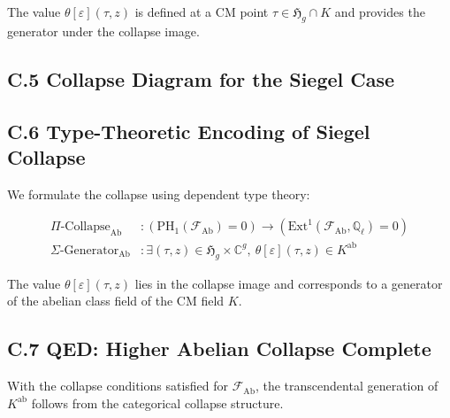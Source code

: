 \documentclass[11pt]{article}
\begin{document}
The value \( \theta[\varepsilon](\tau, z) \) is defined at a CM point \( \tau \in \mathfrak{H}_g \cap K \) and provides the generator under the collapse image.

\subsection*{C.5 Collapse Diagram for the Siegel Case}

\begin{center}
\end{center}

\subsection*{C.6 Type-Theoretic Encoding of Siegel Collapse}

We formulate the collapse using dependent type theory:

\begin{align*}
\Pi\text{-Collapse}_{\mathrm{Ab}} &\colon \left( \mathrm{PH}_1(\mathcal{F}_{\mathrm{Ab}}) = 0 \right) \rightarrow \left( \mathrm{Ext}^1(\mathcal{F}_{\mathrm{Ab}}, \mathbb{Q}_\ell) = 0 \right) \\
\Sigma\text{-Generator}_{\mathrm{Ab}} &\colon \exists (\tau, z) \in \mathfrak{H}_g \times \mathbb{C}^g,\ \theta[\varepsilon](\tau, z) \in K^{\mathrm{ab}}
\end{align*}

The value \( \theta[\varepsilon](\tau, z) \) lies in the collapse image and corresponds to a generator of the abelian class field of the CM field \( K \).

\subsection*{C.7 QED: Higher Abelian Collapse Complete}

With the collapse conditions satisfied for \( \mathcal{F}_{\mathrm{Ab}} \), the transcendental generation of \( K^{\mathrm{ab}} \) follows from the categorical collapse structure.
\end{document}
